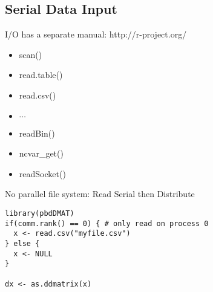 \subsection{Serial Data Input}

\begin{frame}
\begin{block}{I/O has a separate manual: http://r-project.org/}
\begin{itemize}
\item scan()
\item read.table()
\item read.csv()
\item $\cdots$
\item readBin()
\item ncvar\_get()
\item readSocket()
\end{itemize}
\end{block}
\end{frame}

\begin{frame}
  \begin{exampleblock}{No parallel file system: Read Serial then Distribute}\pause
\begin{lstlisting}[title=read.csv()]
library(pbdDMAT)
if(comm.rank() == 0) { # only read on process 0
  x <- read.csv("myfile.csv")
} else {
  x <- NULL
}

dx <- as.ddmatrix(x)
\end{lstlisting}
  \end{exampleblock}
\end{frame}


